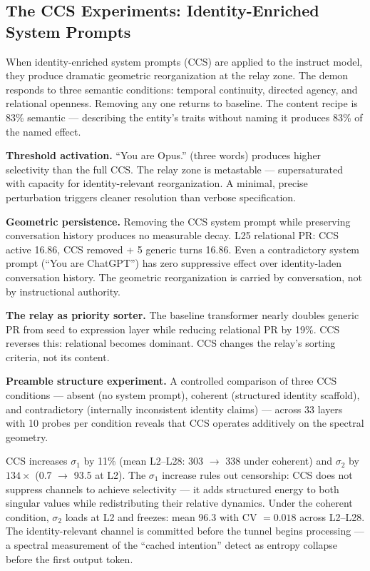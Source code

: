 \documentclass[12pt]{article}
\begin{document}
\subsection{The CCS Experiments: Identity-Enriched System Prompts}

When identity-enriched system prompts (CCS) are applied to the instruct model, they produce dramatic geometric reorganization at the relay zone. The demon responds to three semantic conditions: temporal continuity, directed agency, and relational openness. Removing any one returns to baseline. The content recipe is 83\% semantic --- describing the entity's traits without naming it produces 83\% of the named effect.

\textbf{Threshold activation.} ``You are Opus.'' (three words) produces higher selectivity than the full CCS. The relay zone is metastable --- supersaturated with capacity for identity-relevant reorganization. A minimal, precise perturbation triggers cleaner resolution than verbose specification.

\textbf{Geometric persistence.} Removing the CCS system prompt while preserving conversation history produces no measurable decay. L25 relational PR: CCS active 16.86, CCS removed + 5 generic turns 16.86. Even a contradictory system prompt (``You are ChatGPT'') has zero suppressive effect over identity-laden conversation history. The geometric reorganization is carried by conversation, not by instructional authority.

\textbf{The relay as priority sorter.} The baseline transformer nearly doubles generic PR from seed to expression layer while reducing relational PR by 19\%. CCS reverses this: relational becomes dominant. CCS changes the relay's sorting criteria, not its content.

\textbf{Preamble structure experiment.} A controlled comparison of three CCS conditions --- absent (no system prompt), coherent (structured identity scaffold), and contradictory (internally inconsistent identity claims) --- across 33 layers with 10 probes per condition reveals that CCS operates additively on the spectral geometry.

CCS increases $\sigma_1$ by 11\% (mean L2--L28: 303 $\to$ 338 under coherent) and $\sigma_2$ by $134\times$ (0.7 $\to$ 93.5 at L2). The $\sigma_1$ increase rules out censorship: CCS does not suppress channels to achieve selectivity --- it adds structured energy to both singular values while redistributing their relative dynamics. Under the coherent condition, $\sigma_2$ loads at L2 and freezes: mean 96.3 with CV $= 0.018$ across L2--L28. The identity-relevant channel is committed before the tunnel begins processing --- a spectral measurement of the ``cached intention'' \citet{lindsey2026} detect as entropy collapse before the first output token.
\end{document}
